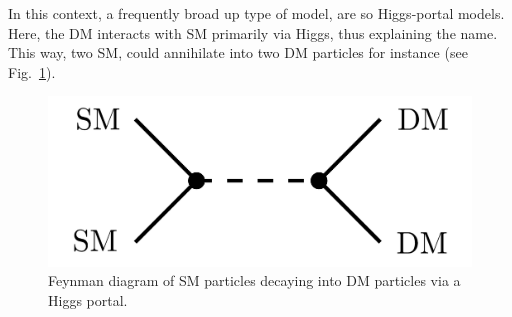 In this context, a frequently broad up type of model, are so Higgs-portal models. Here, the \acs{DM} interacts with \acs{SM} primarily via Higgs, thus explaining the name. This way, two \acs{SM}, could annihilate into two \acs{DM} particles for instance (see Fig.~\ref{fig:3:Higgs_portal}).
\begin{figure}[h]
\centering
\includegraphics[scale=0.2]{Images/Higgs_portal.pdf}
\caption{Feynman diagram of \acs{SM} particles decaying into \acs{DM} particles via a Higgs portal.}
\label{fig:3:Higgs_portal}
\end{figure}

